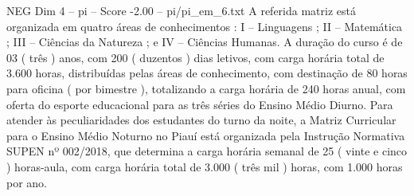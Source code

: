 \begin{textsample}{NEG Dim 4 – pi – Score -2.00 – pi/pi\_em\_6.txt}
A referida matriz está organizada em quatro áreas de conhecimentos : I – Linguagens ; II – Matemática ; III – Ciências da Natureza ; e IV – Ciências Humanas.
A duração do curso é de 03 ( três ) anos, com 200 ( duzentos ) dias letivos, com carga horária total de 3.600 horas, distribuídas pelas áreas de conhecimento, com destinação de 80 horas para oficina ( por bimestre ), totalizando a carga horária de 240 horas anual, com oferta do esporte educacional para as três séries do Ensino Médio Diurno.
Para atender às peculiaridades dos estudantes do turno da noite, a Matriz Curricular para o Ensino Médio Noturno no Piauí está organizada pela Instrução Normativa SUPEN nº 002/2018, que determina a carga horária semanal de 25 ( vinte e cinco ) horas-aula, com carga horária total de 3.000 ( três mil ) horas, com 1.000 horas por ano.

\end{textsample}
